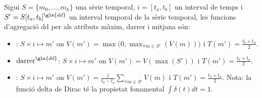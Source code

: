 \begin{definition}
  \label{def:sgstm:maxdd}
  Sigui $S=\{m_0,\dotsc,m_k\}$ una sèrie temporal, $i=[t_a,t_b]$ un
  interval de temps i $S'=S[t_a,t_b]^{\gls{dd}}$ un interval temporal
  de la sèrie temporal, les funcions d'agregació \gls{dd} per als
  atributs màxim, darrer i mitjana són:
\begin{itemize}
\item {}: $S
  \times i \mapsto m'$ on $V(m') = \max\big(0,\max_{\forall m \in
    S'}(V(m))\big)$ i $T(m')=\frac{t_b+t_a}{2}$. 

\item $\operatorname{darrer}^{\gls{dd}}$: $S \times i \mapsto m'$ on $V(m') =
  V(\max(S'))$ i $T(m')=\frac{t_b+t_a}{2}$.

\item {}: $S \times i \mapsto m'$ on
  $V(m') = \frac{1}{t_b-t_a}\sum\limits_{\forall m \in S'} V(m)$ i
  $T(m')=\frac{t_b+t_a}{2}$. Nota: la funció delta de Dirac té la
  propietat fonamental $\int \delta(t)dt = 1$. 
\end{itemize}
\end{definition}



